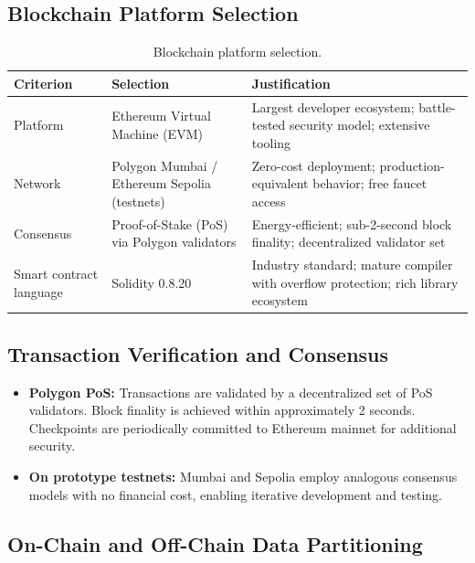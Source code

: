 \documentclass[11pt,a4paper]{article}
\newcommand{\tableheadfont}{\bfseries\small\color{PrimaryBlue}}
\newenvironment{moderntable}[1][H]{%
    \begin{table}[#1]\centering\small%
    \renewcommand{\arraystretch}{1.35}%
}{%
    \end{table}%
}
\begin{document}
\subsection{Blockchain Platform Selection}

\begin{moderntable}
\caption{Blockchain platform selection.}
\begin{tabular}{@{} >{\raggedright}p{3cm} >{\raggedright}p{3.8cm} >{\raggedright\arraybackslash}p{5.2cm} @{}}
\toprule
\tableheadfont Criterion & \tableheadfont Selection & \tableheadfont Justification \\
\midrule
\rowcolor{RowShade}
Platform & Ethereum Virtual Machine (EVM) & Largest developer ecosystem; battle-tested security model; extensive tooling \\
Network & Polygon Mumbai / Ethereum Sepolia (testnets) & Zero-cost deployment; production-equivalent behavior; free faucet access \\
\rowcolor{RowShade}
Consensus & Proof-of-Stake (PoS) via Polygon validators & Energy-efficient; sub-2-second block finality; decentralized validator set \\
Smart contract language & Solidity 0.8.20 & Industry standard; mature compiler with overflow protection; rich library ecosystem \\
\bottomrule
\end{tabular}
\end{moderntable}

\subsection{Transaction Verification and Consensus}

\begin{itemize}[noitemsep]
\item \textbf{Polygon PoS:} Transactions are validated by a decentralized set of PoS validators. Block finality is achieved within approximately 2 seconds. Checkpoints are periodically committed to Ethereum mainnet for additional security.
\item \textbf{On prototype testnets:} Mumbai and Sepolia employ analogous consensus models with no financial cost, enabling iterative development and testing.
\end{itemize}

\subsection{On-Chain and Off-Chain Data Partitioning}
\end{document}
